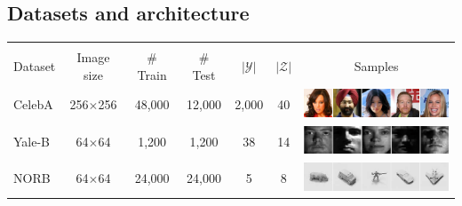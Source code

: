\subsection{Datasets and architecture}

\begin{table}[t]
    \centering
    \renewcommand{\arraystretch}{1.9}
    \begin{tabular}{@{}lcccccc@{}}
      \toprule \\[-2.9em] %
      Dataset & Image size & \# Train & \# Test & $|\mathcal Y|$ & $|\mathcal Z|$ & Samples \\[-0.25em]
      \midrule
      CelebA   & 256$\times$256 & 48,000 & 12,000 & 2,000 & 40 & \includegraphics[align=c,width=5.2cm]{images/dataset_celeba} \\
      Yale-B   & 64$\times$64   &  1,200 &  1,200 & 38 & 14 & \includegraphics[align=c,width=5.2cm]{images/dataset_yale} \\
      NORB     & 64$\times$64   & 24,000 & 24,000 & 5 & 8 & \includegraphics[align=c,width=5.2cm]{images/dataset_norb} \\
      \bottomrule
    \end{tabular}
    \label{dualdis:tab:datasets}
  \end{table}

